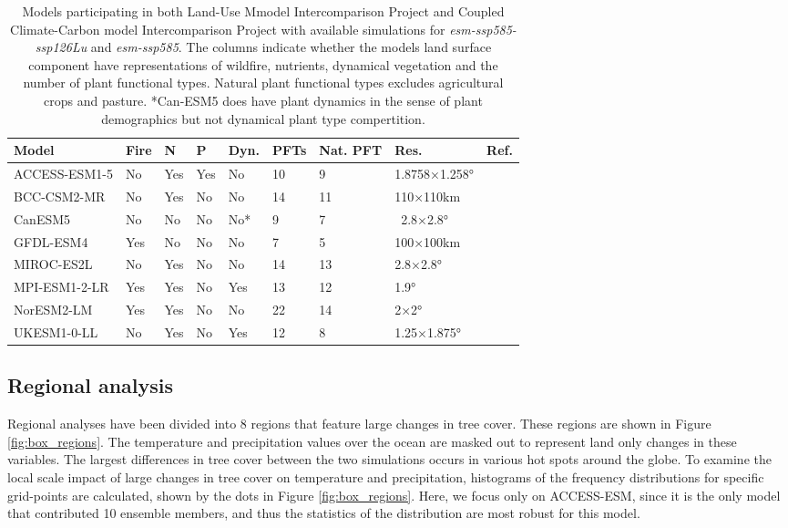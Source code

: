 \documentclass[]{article}
\begin{document}
\begin{table}[H]
    \centering
    \begin{tabular}{lllllllll}
        \hline
Model         & Fire & N   & P   & Dyn. & PFTs & Nat. PFT & Res. & Ref.                                         \\ \hline
ACCESS-ESM1-5 & No   & Yes & Yes & No    & 10       & 9       & 1.8758×1.258°   & \cite{ziehn_australian_2020}   \\
BCC-CSM2-MR   & No   & Yes & No  & No    & 14       & 11      & 110×110km       & \cite{li_development_2019}     \\
CanESM5       & No   & No  & No  & No*   & 9        & 7       & ~2.8×2.8°       & \cite{swart_canadian_2019}     \\
GFDL-ESM4     & Yes  & No  & No  & No    & 7        & 5       & 100×100km       & \cite{dunne_gfdl_2020}         \\
MIROC-ES2L    & No   & Yes & No  & No    & 14       & 13      & 2.8×2.8°        & \cite{hajima_development_2020} \\
MPI-ESM1-2-LR & Yes  & Yes & No  & Yes   & 13       & 12      & 1.9°            & \cite{giorgetta_climate_2013}  \\
NorESM2-LM    & Yes  & Yes & No  & No    & 22       & 14      & 2×2°            & \cite{seland_norwegian_2020}   \\
UKESM1-0-LL   & No   & Yes & No  & Yes   & 12       & 8       & 1.25×1.875°     & \cite{sellar_ukesm1_2019}      \\ \hline
    \end{tabular}
    \caption{Models participating in both Land-Use Mmodel Intercomparison Project and Coupled Climate-Carbon model Intercomparison Project with available simulations for \textit{esm-ssp585-ssp126Lu} and \textit{esm-ssp585}. The columns indicate whether the models land surface component have representations of wildfire, nutrients, dynamical vegetation and the number of plant functional types. Natural plant functional types excludes agricultural crops and pasture. *Can-ESM5 does have plant dynamics in the sense of plant demographics but not dynamical plant type compertition.}
    \label{tab:models}
\end{table}

\subsection{Regional analysis}

Regional analyses have been divided into 8 regions that feature large changes in tree cover.
These regions are shown in Figure \ref{fig:box_regions}.
The temperature and precipitation values over the ocean are masked out to represent land only changes in these variables.
The largest differences in tree cover between the two simulations occurs in various hot spots around the globe.
To examine the local scale impact of large changes in tree cover on temperature and precipitation, histograms of the frequency distributions for specific grid-points are calculated, shown by the dots in Figure \ref{fig:box_regions}.
Here, we focus only on ACCESS-ESM, since it is the only model that contributed 10 ensemble members, and thus the statistics of the distribution are most robust for this model.
\end{document}
